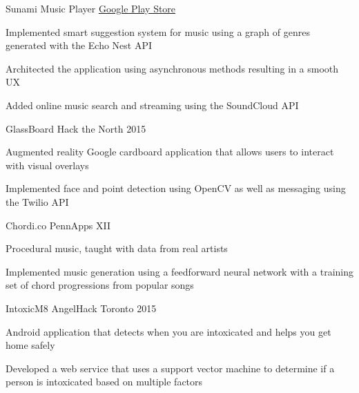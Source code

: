 \begin{cvprojects}
  \cvproject
    {Sunami Music Player}
    {\href{http://play.google.com/store/apps/details?id=com.wojtechnology.sunami}{Google Play Store}}
    {
      \begin{cvitems}
        \item Implemented smart suggestion system for music using a graph of genres generated with the Echo Nest API
        \item Architected the application using asynchronous methods resulting in a smooth UX
        \item Added online music search and streaming using the SoundCloud API
      \end{cvitems}
    }
  \cvproject
    {GlassBoard}
    {Hack the North 2015}
    {
      \begin{cvitems}
        \item Augmented reality Google cardboard application that allows users to interact with visual overlays
        \item Implemented face and point detection using OpenCV as well as messaging using the Twilio API
      \end{cvitems}
    }
  \cvproject
    {Chordi.co}
    {PennApps XII}
    {
      \begin{cvitems}
        \item Procedural music, taught with data from real artists
        \item Implemented music generation using a feedforward neural network with a training set of chord progressions from popular songs
      \end{cvitems}
    }
  \cvproject
    {IntoxicM8}
    {AngelHack Toronto 2015}
    {
      \begin{cvitems}
        \item Android application that detects when you are intoxicated and helps you get home safely
        \item Developed a web service that uses a support vector machine to determine if a person is intoxicated based on multiple factors
      \end{cvitems}
    }
\end{cvprojects}
